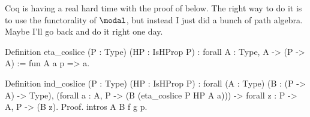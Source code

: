 Coq is having a real hard time with the proof of
 below.  The right way to do it is to use the functorality of $\modal$, but instead I just did a bunch of path algebra.  Maybe I'll go back and do it right one day.\begin{coqdoccode}
\coqdocemptyline
\coqdocnoindent
\begin{coqdoccomment}
\coqdoceol
Definition\coqdocindent{0.50em}
eta\_coslice\coqdocindent{0.50em}
(P\coqdocindent{0.50em}
:\coqdocindent{0.50em}
Type)\coqdocindent{0.50em}
(HP\coqdocindent{0.50em}
:\coqdocindent{0.50em}
IsHProp\coqdocindent{0.50em}
P)\coqdocindent{0.50em}
\coqdoceol
\coqdocindent{1.00em}
:\coqdocindent{0.50em}
forall\coqdocindent{0.50em}
A\coqdocindent{0.50em}
:\coqdocindent{0.50em}
Type,\coqdocindent{0.50em}
A\coqdocindent{0.50em}
->\coqdocindent{0.50em}
(P\coqdocindent{0.50em}
->\coqdocindent{0.50em}
A)\coqdoceol
\coqdocindent{1.00em}
:=\coqdocindent{0.50em}
fun\coqdocindent{0.50em}
A\coqdocindent{0.50em}
a\coqdocindent{0.50em}
p\coqdocindent{0.50em}
=>\coqdocindent{0.50em}
a.\coqdoceol
\end{coqdoccomment}
\coqdoceol
\coqdocemptyline
\coqdocnoindent
\begin{coqdoccomment}
\coqdoceol
Definition\coqdocindent{0.50em}
ind\_coslice\coqdocindent{0.50em}
(P\coqdocindent{0.50em}
:\coqdocindent{0.50em}
Type)\coqdocindent{0.50em}
(HP\coqdocindent{0.50em}
:\coqdocindent{0.50em}
IsHProp\coqdocindent{0.50em}
P)\coqdoceol
\coqdocindent{1.00em}
:\coqdocindent{0.50em}
forall\coqdocindent{0.50em}
(A\coqdocindent{0.50em}
:\coqdocindent{0.50em}
Type)\coqdocindent{0.50em}
(B\coqdocindent{0.50em}
:\coqdocindent{0.50em}
(P\coqdocindent{0.50em}
->\coqdocindent{0.50em}
A)\coqdocindent{0.50em}
->\coqdocindent{0.50em}
Type),\coqdoceol
\coqdocindent{3.00em}
(forall\coqdocindent{0.50em}
a\coqdocindent{0.50em}
:\coqdocindent{0.50em}
A,\coqdocindent{0.50em}
P\coqdocindent{0.50em}
->\coqdocindent{0.50em}
(B\coqdocindent{0.50em}
(eta\_coslice\coqdocindent{0.50em}
P\coqdocindent{0.50em}
HP\coqdocindent{0.50em}
A\coqdocindent{0.50em}
a)))\coqdocindent{0.50em}
\coqdoceol
\coqdocindent{3.00em}
->\coqdocindent{0.50em}
forall\coqdocindent{0.50em}
z\coqdocindent{0.50em}
:\coqdocindent{0.50em}
P\coqdocindent{0.50em}
->\coqdocindent{0.50em}
A,\coqdocindent{0.50em}
P\coqdocindent{0.50em}
->\coqdocindent{0.50em}
(B\coqdocindent{0.50em}
z).\coqdoceol
Proof.\coqdoceol
\coqdocindent{1.00em}
intros\coqdocindent{0.50em}
A\coqdocindent{0.50em}
B\coqdocindent{0.50em}
f\coqdocindent{0.50em}
g\coqdocindent{0.50em}
p.\coqdoceol
\coqdocindent{1.00em}

\end{coqdoccomment}
\end{coqdoccode}
